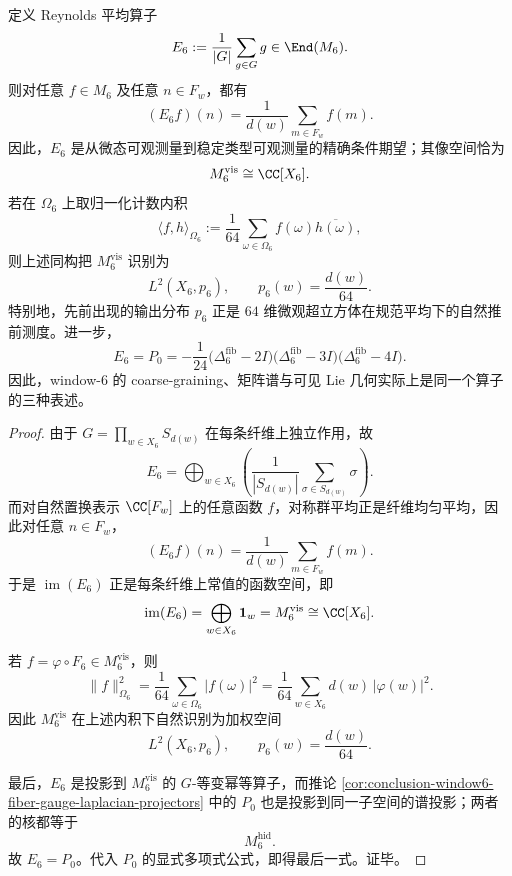 

\begin{proposition}\label{prop:conclusion-window6-reynolds-average-zero-mode-projector}
定义 Reynolds 平均算子
\[
E_6:=\frac1{|G|}\sum_{g\in G}g
\in \End(M_6).
\]
则对任意 \(f\in M_6\) 及任意 \(n\in F_w\)，都有
\[
(E_6f)(n)=\frac1{d(w)}\sum_{m\in F_w}f(m).
\]
因此，\(E_6\) 是从微态可观测量到稳定类型可观测量的精确条件期望；其像空间恰为
\[
M_6^{\mathrm{vis}}\cong \CC[X_6].
\]
若在 \(\Omega_6\) 上取归一化计数内积
\[
\langle f,h\rangle_{\Omega_6}:=\frac1{64}\sum_{\omega\in\Omega_6}f(\omega)\overline{h(\omega)},
\]
则上述同构把 \(M_6^{\mathrm{vis}}\) 识别为
\[
L^2(X_6,p_6),
\qquad
p_6(w)=\frac{d(w)}{64}.
\]
特别地，先前出现的输出分布 \(p_6\) 正是 \(64\) 维微观超立方体在规范平均下的自然推前测度。进一步，
\[
E_6=P_0
=
-\frac1{24}\bigl(\Delta_6^{\mathrm{fib}}-2I\bigr)\bigl(\Delta_6^{\mathrm{fib}}-3I\bigr)\bigl(\Delta_6^{\mathrm{fib}}-4I\bigr).
\]
因此，window-\(6\) 的 coarse-graining、矩阵谱与可见 Lie 几何实际上是同一个算子的三种表述。
\end{proposition}
\begin{proof}
由于 \(G=\prod_{w\in X_6}S_{d(w)}\) 在每条纤维上独立作用，故
\[
E_6=\bigoplus_{w\in X_6}\left(\frac1{|S_{d(w)}|}\sum_{\sigma\in S_{d(w)}}\sigma\right).
\]
而对自然置换表示 \(\CC[F_w]\) 上的任意函数 \(f\)，对称群平均正是纤维均匀平均，因此对任意 \(n\in F_w\)，
\[
(E_6f)(n)=\frac1{d(w)}\sum_{m\in F_w}f(m).
\]
于是 \(\operatorname{im}(E_6)\) 正是每条纤维上常值的函数空间，即
\[
\operatorname{im}(E_6)=\bigoplus_{w\in X_6}\mathbf 1_w=M_6^{\mathrm{vis}}\cong \CC[X_6].
\]

若 \(f=\varphi\circ F_6\in M_6^{\mathrm{vis}}\)，则
\[
\|f\|_{\Omega_6}^2
=
\frac1{64}\sum_{\omega\in\Omega_6}|f(\omega)|^2
=
\frac1{64}\sum_{w\in X_6}d(w)\,|\varphi(w)|^2.
\]
因此 \(M_6^{\mathrm{vis}}\) 在上述内积下自然识别为加权空间
\[
L^2(X_6,p_6),
\qquad
p_6(w)=\frac{d(w)}{64}.
\]

最后，\(E_6\) 是投影到 \(M_6^{\mathrm{vis}}\) 的 \(G\)-等变幂等算子，而推论 \ref{cor:conclusion-window6-fiber-gauge-laplacian-projectors} 中的 \(P_0\) 也是投影到同一子空间的谱投影；两者的核都等于
\[
M_6^{\mathrm{hid}}.
\]
故 \(E_6=P_0\)。代入 \(P_0\) 的显式多项式公式，即得最后一式。证毕。
\end{proof}

